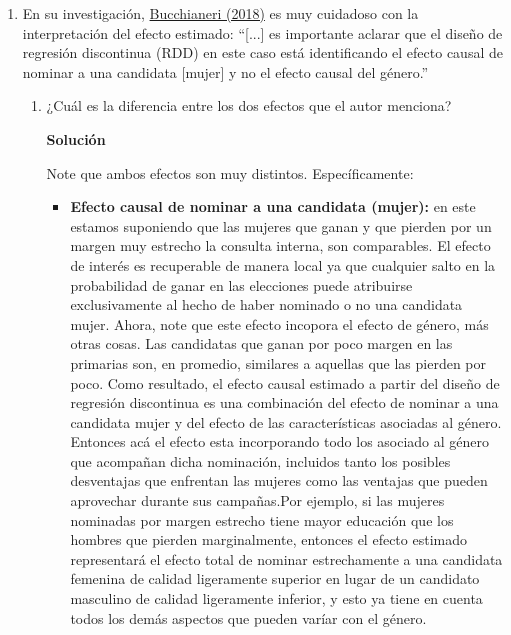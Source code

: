 \documentclass[a4paper, answers, addpoints, 11pt]{exam}
\newenvironment{solucion}{%
  \begin{mdframed}[
    backgroundcolor=blue!5,    %
    linecolor=blue!50,          %
    linewidth=2pt,              %
    leftmargin=10pt,            %
    rightmargin=8pt,           %
    topline=true,              %
    bottomline=true,            %
    roundcorner=10pt,           %
    innerleftmargin=10pt,       %
    innerrightmargin=10pt,      %
    innerbottommargin=10pt,     %
    innertopmargin=10pt         %
  ]%
  \begin{tcolorbox}[colframe=blue!50!black, colback=blue!50, coltitle=white, sharp corners=all, boxrule=1mm, width=\textwidth, halign=left, valign=center, top=0mm, bottom=0mm, left=0mm, right=0mm] \textbf{Solución} \end{tcolorbox} }{\end{mdframed}}
\begin{document}
\begin{enumerate}[resume]
\begin{enumerate}
\begin{solucion}
\end{solucion}
    \end{enumerate}
    \item En su investigación, \href{https://link.springer.com/article/10.1007/s11109-017-9407-7}{Bucchianeri (2018)} es muy cuidadoso con la interpretación del efecto estimado: ``[...] es importante aclarar que el diseño de regresión discontinua (RDD) en este caso está identificando el efecto causal de nominar a una candidata [mujer] y no el efecto causal del género.'' 

    \begin{enumerate}
        \item ¿Cuál es la diferencia entre los dos efectos que el autor menciona?
\begin{solucion}
Note que ambos efectos son muy distintos. Específicamente:

\begin{itemize}
    \item \textbf{Efecto causal de nominar a una candidata (mujer):} en este estamos suponiendo que las mujeres que ganan  y que pierden por un margen muy estrecho la consulta interna, son comparables. El efecto de interés es recuperable de manera local ya que cualquier salto en la probabilidad de ganar en las elecciones puede atribuirse exclusivamente al hecho de haber nominado o no una candidata mujer. Ahora, note que este efecto incopora el efecto de género, más otras cosas. Las candidatas que ganan por poco margen en las primarias son, en promedio, similares a aquellas que las pierden por poco. Como resultado, el efecto causal estimado a partir del diseño de regresión discontinua es una combinación del efecto de nominar a una candidata mujer y del efecto de las características asociadas al género. Entonces acá el efecto esta incorporando todo los asociado al género que acompañan dicha nominación, incluidos tanto los posibles desventajas que enfrentan las mujeres como las ventajas que pueden aprovechar durante sus campañas.Por ejemplo,  si las mujeres nominadas por margen estrecho tiene mayor educación que los hombres que pierden marginalmente, entonces el efecto estimado representará el efecto total de nominar estrechamente a una candidata femenina de calidad ligeramente superior en lugar de un candidato masculino de calidad ligeramente inferior, y esto ya tiene en cuenta todos los demás aspectos que pueden varíar con el género.
    

\end{itemize}
\end{solucion}
\end{enumerate}
\end{enumerate}
\end{document}

